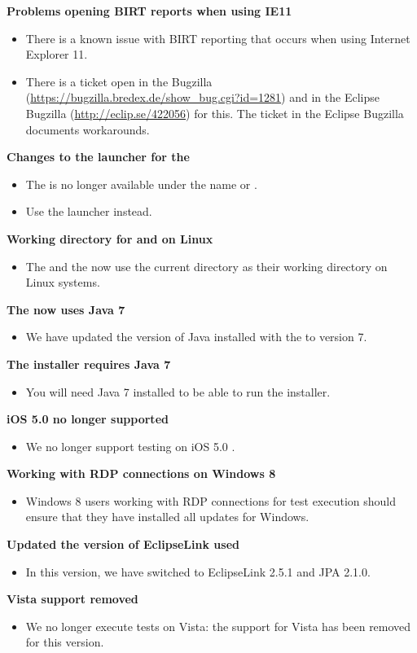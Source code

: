
\textbf{Problems opening BIRT reports when using IE11}
\begin{itemize}
\item There is a known issue with BIRT reporting that occurs when using Internet Explorer 11. 
\item There is a ticket open in the \gd{} Bugzilla (\url{https://bugzilla.bredex.de/show_bug.cgi?id=1281}) and in the Eclipse Bugzilla (\url{http://eclip.se/422056}) for this. The ticket in the Eclipse Bugzilla documents workarounds.
\end{itemize}

\textbf{Changes to the launcher for the \gdagent{}}
\begin{itemize}
\item The \gdagent{} is no longer available under the name  or .
\item Use the launcher  instead.
\end{itemize}

\textbf{Working directory for \ite{} and \gdagent{} on Linux}
\begin{itemize}
\item The \gdagent{} and the \ite{} now  use the current directory as their working directory on Linux systems.
\end{itemize}


\textbf{The \ite{} now uses Java 7}
\begin{itemize}
\item We have updated the version of Java installed with the \ite{} to version 7.
\end{itemize}

\textbf{The installer requires Java 7}
\begin{itemize}
\item You will need Java 7 installed to be able to run the installer.
\end{itemize}

\textbf{iOS 5.0 no longer supported}
\begin{itemize}
\item We no longer support testing on iOS 5.0 \gdauts{}.
\end{itemize}

\textbf{Working with RDP connections on Windows 8}
\begin{itemize}
\item Windows 8 users working with RDP connections for test execution should ensure that they have installed all updates for Windows. 
\end{itemize}

\textbf{Updated the version of EclipseLink used}
\begin{itemize}
\item In this version, we have switched to EclipseLink 2.5.1 and JPA 2.1.0.
\end{itemize}

\textbf{Vista support removed}
\begin{itemize}
\item We no longer execute tests on Vista: the support for Vista has been removed for this version.
\end{itemize}
